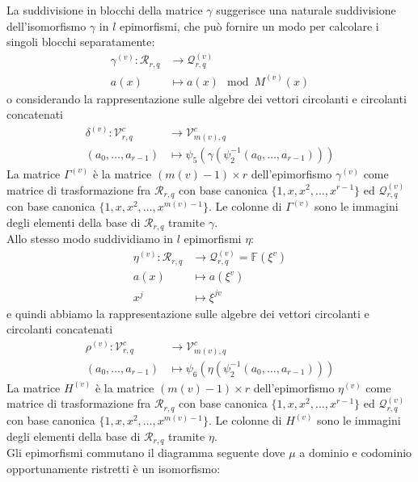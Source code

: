 La suddivisione in blocchi della matrice $\gamma$ suggerisce una naturale suddivisione dell'isomorfismo $\gamma$ in $l$ epimorfismi, che può fornire un modo per calcolare i singoli blocchi separatamente:
\begin{align*}
  \gamma^{(v)} :  \mathcal{R}_{r,q}
  & \longrightarrow
  \mathcal{Q}_{r,q}^{(v)}  \\
  a(x)
  &\longmapsto
  a(x) \mod{M^{(v)}(x)}
\end{align*}
o considerando la rappresentazione sulle algebre dei vettori circolanti e circolanti concatenati
\begin{align*}
  \delta^{(v)} :  \mathcal{V}_{r, q}^{c}
  & \longrightarrow
  \mathcal{V}_{m(v), q}^{c}   \\
  ( a_0, \dots , a_{r-1} )
  &\longmapsto
  \psi_{5} ( \gamma ( \psi_{2}^{-1} ( a_0, \dots , a_{r-1} )))
\end{align*}
La matrice $\Gamma^{(v)}$ è la matrice $(m(v)-1)\times r$ dell'epimorfismo $\gamma^{(v)}$ come matrice di trasformazione fra $\mathcal{R}_{r,q}$ con base canonica $\lbrace 1,x,x^2, \dots , x^{r-1}\rbrace$ ed $\mathcal{Q}_{r,q}^{(v)}$ con base canonica $\lbrace 1,x,x^2, \dots , x^{m(v)-1}\rbrace$. Le colonne di $\Gamma^{(v)}$ sono le immagini degli elementi della base di $\mathcal{R}_{r,q}$ tramite $\gamma$. \\
Allo stesso modo suddividiamo in $l$ epimorfismi $\eta$:
\begin{align*}
  \eta^{(v)} :  \mathcal{R}_{r,q}
  & \longrightarrow
  \mathcal{Q}_{r,q}^{(v)} =  \mathbb{F} (\xi^{v})  \\
  a(x)
  &\longmapsto
  a(\xi^{v}) \\
  x^{j}
  &\longmapsto
  \xi^{jv}
\end{align*}
e quindi abbiamo la rappresentazione sulle algebre dei vettori circolanti e circolanti concatenati
\begin{align*}
  \rho^{(v)} :  \mathcal{V}_{r, q}^{c}
  & \longrightarrow
  \mathcal{V}_{m(v), q}^{c}   \\
  ( a_0, \dots , a_{r-1} )
  &\longmapsto
  \psi_{6} ( \eta ( \psi_{2}^{-1} ( a_0, \dots , a_{r-1} )))
\end{align*}
La matrice $H^{(v)}$ è la matrice $(m(v)-1)\times r$ dell'epimorfismo $\eta^{(v)}$ come matrice di trasformazione fra $\mathcal{R}_{r,q}$ con base canonica $\lbrace 1,x,x^2, \dots , x^{r-1}\rbrace$ ed $\mathcal{Q}_{r,q}^{(v)}$ con base canonica $\lbrace 1,x,x^2, \dots , x^{m(v)-1}\rbrace$. Le colonne di $H^{(v)}$ sono le immagini degli elementi della base di $\mathcal{R}_{r,q}$ tramite $\eta$. \\
Gli epimorfismi commutano il diagramma seguente dove $\mu$ a dominio e codominio opportunamente ristretti è un isomorfismo:


